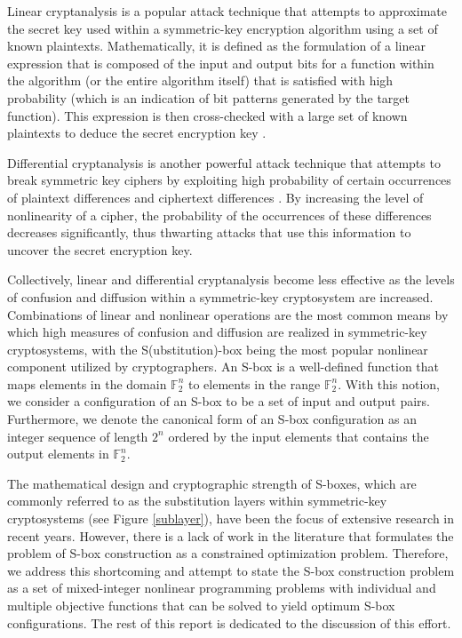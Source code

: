 \documentclass[11pt]{article}
\newcommand{\field}[1]{\mathbb{#1}} %
\begin{document}
Linear cryptanalysis is a popular attack technique that attempts to approximate the secret key used within a symmetric-key encryption algorithm using a set of known plaintexts. Mathematically, it is defined as the formulation of a linear expression that is composed of the input and output bits for a function within the algorithm (or the entire algorithm itself) that is satisfied with high probability (which is an indication of bit patterns generated by the target function). This expression is then cross-checked with a large set of known plaintexts to deduce the secret encryption key \cite{Heys01atutorial}.

Differential cryptanalysis is another powerful attack technique that attempts to break symmetric key ciphers by exploiting high probability of certain occurrences of plaintext differences and ciphertext differences \cite{Heys01atutorial}. By increasing the level of nonlinearity of a cipher, the probability of the occurrences of these differences decreases significantly, thus thwarting attacks that use this information to uncover the secret encryption key. 

Collectively, linear and differential cryptanalysis become less effective as the levels of confusion and diffusion within a symmetric-key cryptosystem are increased. Combinations of linear and nonlinear operations are the most common means by which high measures of confusion and diffusion are realized in symmetric-key cryptosystems, with the S(ubstitution)-box being the most popular nonlinear component utilized by cryptographers. An S-box is a well-defined function that maps elements in the domain $\field{F}_2^n$ to elements in the range $\field{F}_2^n$. With this notion, we consider a configuration of an S-box to be a set of input and output pairs. Furthermore, we denote the canonical form of an S-box configuration as an integer sequence of length $2^n$ ordered by the input elements that contains the output elements in $\field{F}_2^n$.

The mathematical design and cryptographic strength of S-boxes, which are commonly referred to as the substitution layers within symmetric-key cryptosystems (see Figure \ref{sublayer}), have been the focus of extensive research in recent years. However, there is a lack of work in the literature that formulates the problem of S-box construction as a constrained optimization problem. Therefore, we address this shortcoming and attempt to state the S-box construction problem as a set of mixed-integer nonlinear programming problems with individual and multiple objective functions that can be solved to yield optimum S-box configurations. The rest of this report is dedicated to the discussion of this effort.
\end{document}

